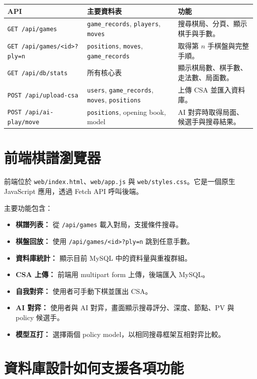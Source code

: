 \documentclass[12pt,a4paper,fontset=none]{ctexart}
\begin{document}
\begin{longtable}{p{}p{}p{}}
\toprule
\textbf{API} & \textbf{主要資料表} & \textbf{功能}\\
\midrule
\endhead
\texttt{GET /api/games} & \texttt{game\_records}, \texttt{players}, \texttt{moves} & 搜尋棋局、分頁、顯示棋手與手數。\\
\texttt{GET /api/games/<id>?ply=n} & \texttt{positions}, \texttt{moves}, \texttt{game\_records} & 取得第 $n$ 手棋盤與完整手順。\\
\texttt{GET /api/db/stats} & 所有核心表 & 顯示棋局數、棋手數、走法數、局面數。\\
\texttt{POST /api/upload-csa} & \texttt{users}, \texttt{game\_records}, \texttt{moves}, \texttt{positions} & 上傳 CSA 並匯入資料庫。\\
\texttt{POST /api/ai-play/move} & \texttt{positions}, opening book, model & AI 對弈時取得局面、候選手與搜尋結果。\\
\bottomrule
\end{longtable}

\section{前端棋譜瀏覽器}

前端位於 \texttt{web/index.html}、\texttt{web/app.js} 與 \texttt{web/styles.css}。它是一個原生 JavaScript 應用，透過 Fetch API 呼叫後端。

主要功能包含：

\begin{itemize}
  \item \textbf{棋譜列表：} 從 \texttt{/api/games} 載入對局，支援條件搜尋。
  \item \textbf{棋盤回放：} 使用 \texttt{/api/games/<id>?ply=n} 跳到任意手數。
  \item \textbf{資料庫統計：} 顯示目前 MySQL 中的資料量與重複群組。
  \item \textbf{CSA 上傳：} 前端用 multipart form 上傳，後端匯入 MySQL。
  \item \textbf{自我對弈：} 使用者可手動下棋並匯出 CSA。
  \item \textbf{AI 對弈：} 使用者與 AI 對弈，畫面顯示搜尋評分、深度、節點、PV 與 policy 候選手。
  \item \textbf{模型互打：} 選擇兩個 policy model，以相同搜尋框架互相對弈比較。
\end{itemize}

\section{資料庫設計如何支援各項功能}
\end{document}
